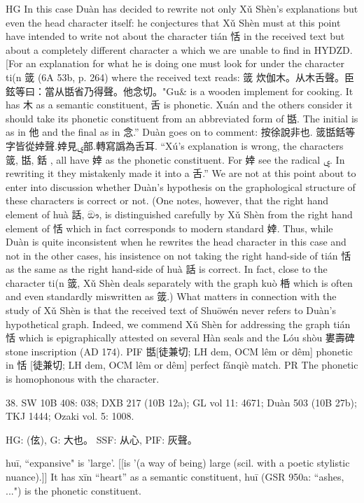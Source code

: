 HG In this case Duàn has decided to rewrite not only Xǔ Shèn's explanations but even the head character itself: he conjectures that Xǔ Shèn must at this point have intended to write not about the character tián 恬 in the received text but about a completely different character a which we are unable to find in HYDZD. [For an explanation for what he is doing one must look for under the character ti(n 䈅 (6A 53b, p. 264) where the received text reads: 䈅 炊伽木。从木舌聲。臣鉉等曰：當从甛省乃得聲。他念切。"Gu& is a wooden implement for cooking. It has 木 as a semantic constituent, 舌 is phonetic. Xuán and the others consider it should take its phonetic constituent from an abbreviated form of 甛. The initial is as in 他 and the final as in 念.'' Duàn goes on to comment: 按徐說非也. 䈅甛銛等字皆從婞聲.婞見ۑ部.轉寫譌為舌耳. ``Xú's explanation is wrong, the characters 䈅, 甛, 銛 , all have 婞 as the phonetic constituent. For 婞 see the radical ۑ. In rewriting it they mistakenly made it into a 舌.'' We are not at this point about to enter into discussion whether Duàn's hypothesis on the graphological structure of these characters is correct or not. (One notes, however, that the right hand element of huà 話, ඖ, is distinguished carefully by Xǔ Shèn from the right hand element of 恬 which in fact corresponds to modern standard 婞. Thus, while Duàn is quite inconsistent when he rewrites the head character in this case and not in the other cases, his insistence on not taking the right hand-side of tián 恬 as the same as the right hand-side of huà 話 is correct. In fact, close to the character ti(n 䈅, Xǔ Shèn deals separately with the graph kuò 桰 which is often and even standardly miswritten as 䈅.)
    What matters in connection with the study of Xǔ Shèn is that the received text of Shuōwén never refers to Duàn's hypothetical graph. Indeed, we commend Xǔ Shèn for addressing the graph tián 恬 which is epigraphically attested on several Hàn seals and the Lóu shòu 婁壽碑 stone inscription (AD 174).
PIF 甛[徒兼切; LH dem, OCM lêm or dêm] phonetic in 恬 [徒兼切; LH dem, OCM lêm or dêm] perfect fǎnqiè match.
PR   The phonetic is homophonous with the character.


38. SW 10B 408: 038; DXB 217 (10B 12a); GL vol 11: 4671; Duàn 503 (10B 27b); TKJ 1444; Ozaki vol. 5: 1008.


HG:	(伭),
G:	大也。
SSF: 从心,
PIF: 灰聲。

huī, ``expansive"
is 'large'. [[is '(a way of being) large (scil. with a poetic stylistic nuance).]]
It has xīn ``heart'' as a semantic constituent,
huī (GSR 950a: ``ashes, ...") is the phonetic constituent.



